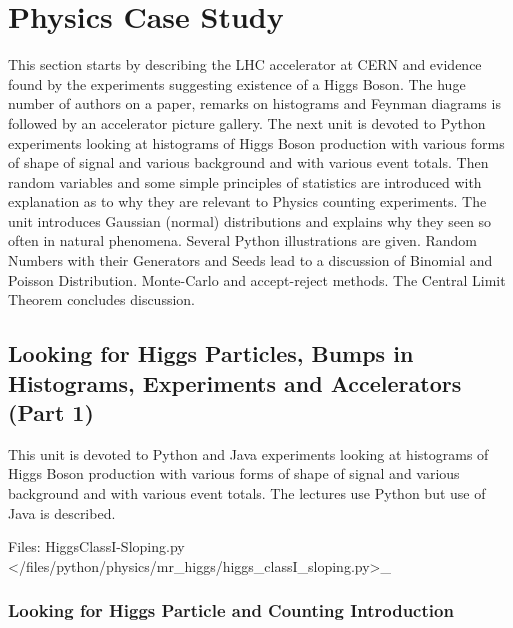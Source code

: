 \FILENAME

\section{Physics Case Study}\label{physics-case-study}

This section starts by describing the LHC accelerator at CERN and
evidence found by the experiments suggesting existence of a Higgs Boson.
The huge number of authors on a paper, remarks on histograms and Feynman
diagrams is followed by an accelerator picture gallery. The next unit is
devoted to Python experiments looking at histograms of Higgs Boson
production with various forms of shape of signal and various background
and with various event totals. Then random variables and some simple
principles of statistics are introduced with explanation as to why they
are relevant to Physics counting experiments. The unit introduces
Gaussian (normal) distributions and explains why they seen so often in
natural phenomena. Several Python illustrations are given. Random
Numbers with their Generators and Seeds lead to a discussion of Binomial
and Poisson Distribution. Monte-Carlo and accept-reject methods. The
Central Limit Theorem concludes discussion.

\subsection{Looking for Higgs Particles, Bumps in Histograms,
Experiments and Accelerators (Part
1)}\label{looking-for-higgs-particles-bumps-in-histograms-experiments-and-accelerators-part-1}

This unit is devoted to Python and Java experiments looking at
histograms of Higgs Boson production with various forms of shape of
signal and various background and with various event totals. The
lectures use Python but use of Java is described.


Files:
HiggsClassI-Sloping.py \textless{}/files/python/physics/mr\_higgs/higgs\_classI\_sloping.py\textgreater{}\_

\subsubsection{Looking for Higgs Particle and Counting
Introduction}\label{looking-for-higgs-particle-and-counting-introduction}

